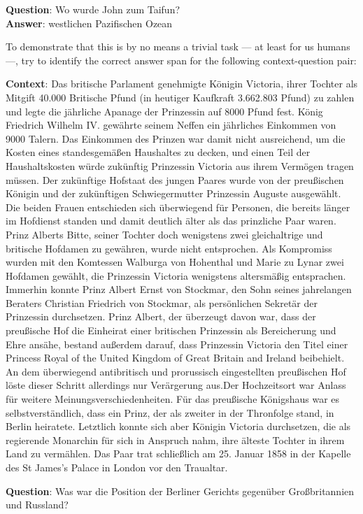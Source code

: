 \begin{examples}
       \textbf{Question}: Wo wurde John zum Taifun?\\
       \textbf{Answer}: westlichen Pazifischen Ozean
\end{examples}

To demonstrate that this is by no means a trivial task --- at least for us humans ---, try to
identify the correct answer span for the following context-question pair:

\begin{examples}
    \item \textbf{Context}:
        Das britische Parlament genehmigte Königin Victoria, ihrer Tochter
        als Mitgift 40.000 Britische Pfund (in heutiger Kaufkraft 3.662.803 Pfund) zu
        zahlen und legte die jährliche Apanage der Prinzessin auf 8000 Pfund fest.
        König Friedrich Wilhelm IV. gewährte seinem Neffen ein jährliches Einkommen
        von 9000 Talern. Das Einkommen des Prinzen war damit nicht ausreichend, um
        die Kosten eines standesgemäßen Haushaltes zu decken, und einen Teil der
        Haushaltskosten würde zukünftig Prinzessin Victoria aus ihrem Vermögen tragen
        müssen. Der zukünftige Hofstaat des jungen Paares wurde von der preußischen
        Königin und der zukünftigen Schwiegermutter Prinzessin Auguste ausgewählt. Die
        beiden Frauen entschieden sich überwiegend für Personen, die bereits länger
        im Hofdienst standen und damit deutlich älter als das prinzliche Paar waren.
        Prinz Alberts Bitte, seiner Tochter doch wenigstens zwei gleichaltrige und
        britische Hofdamen zu gewähren, wurde nicht entsprochen. Als Kompromiss wurden
        mit den Komtessen Walburga von Hohenthal und Marie zu Lynar zwei Hofdamen
        gewählt, die Prinzessin Victoria wenigstens altersmäßig entsprachen. Immerhin
        konnte Prinz Albert Ernst von Stockmar, den Sohn seines jahrelangen Beraters
        Christian Friedrich von Stockmar, als persönlichen Sekretär der Prinzessin
        durchsetzen. Prinz Albert, der überzeugt davon war, dass der preußische Hof
        die Einheirat einer britischen Prinzessin als Bereicherung und Ehre ansähe,
        bestand außerdem darauf, dass Prinzessin Victoria den Titel einer Princess
        Royal of the United Kingdom of Great Britain and Ireland beibehielt. An dem
        überwiegend antibritisch und prorussisch eingestellten preußischen Hof löste
        dieser Schritt allerdings nur Verärgerung aus.Der Hochzeitsort war Anlass
        für weitere Meinungsverschiedenheiten. Für das preußische Königshaus war es
        selbstverständlich, dass ein Prinz, der als zweiter in der Thronfolge stand,
        in Berlin heiratete. Letztlich konnte sich aber Königin Victoria durchsetzen,
        die als regierende Monarchin für sich in Anspruch nahm, ihre älteste Tochter
        in ihrem Land zu vermählen. Das Paar trat schließlich am 25. Januar 1858 in
        der Kapelle des St James’s Palace in London vor den Traualtar.

        \textbf{Question}: Was war die Position der Berliner Gerichts gegenüber Großbritannien und Russland?\\
\end{examples}
